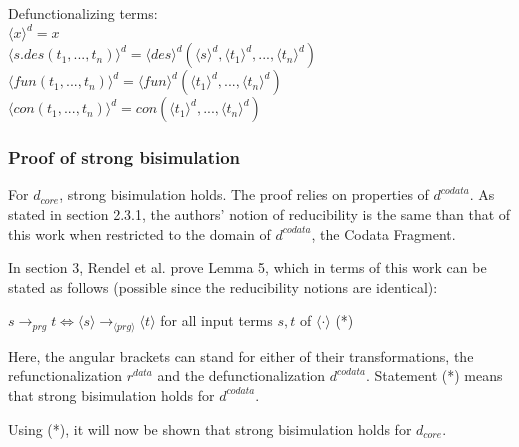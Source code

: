 Defunctionalizing terms: \\
$\langle x \rangle^d = x$ \\
$\langle s.des(t_1, ..., t_n) \rangle^d = \langle des \rangle^d (\langle s \rangle^d, \langle t_1 \rangle^d, ..., \langle t_n \rangle^d)$ \\
$\langle fun(t_1, ..., t_n) \rangle^d = \langle fun \rangle^d (\langle t_1 \rangle^d, ..., \langle t_n \rangle^d)$ \\
$\langle con(t_1, ..., t_n) \rangle^d = con(\langle t_1 \rangle^d, ..., \langle t_n \rangle^d)$ \\

\subsubsection{Proof of strong bisimulation}

For $d_{core}$, strong bisimulation holds. The proof relies on properties of $d^{codata}$. As stated in section 2.3.1, the authors' notion of reducibility is the same than that of this work when restricted to the domain of $d^{codata}$, the Codata Fragment.

In section 3, Rendel et al. prove Lemma 5, which in terms of this work can be stated as follows (possible since the reducibility notions are identical):

$s \longrightarrow_{prg} t \iff \langle s \rangle \longrightarrow_{\langle prg \rangle} \langle t \rangle$ for all input terms $s,t$ of $\langle \cdot \rangle$ (*)

Here, the angular brackets can stand for either of their transformations, the refunctionalization $r^{data}$ and the defunctionalization $d^{codata}$. Statement (*) means that strong bisimulation holds for $d^{codata}$.

Using (*), it will now be shown that strong bisimulation holds for $d_{core}$.

